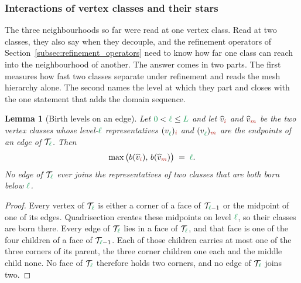 \documentclass[a4paper, 12pt]{article}
\newcommand{\green}{\color{ForestGreen}}
\newcommand{\brickred}{\color{BrickRed}}
\newcommand{\T}{\mathcal{T}}
\newcommand{\vertex}[2]{\freeQ{v}{}{#1}{#2}}
\newcommand{\vertexClass}[1]{\widehat{v}_{#1}}
\newcommand{\coarseIdxone}{{\brickred i}}
\newcommand{\coarseIdxtwo}{{\brickred m}}
\renewcommand{\l}{{\green\ell}}
\renewcommand{\L}{{\green L}}
\newcommand{\lzero}{{\green 0}}
\newcommand{\freeQ}[4]{ ( {#1}^{#2}_{#3} )_{#4}}
\newtheorem{lemma}[theorem]{Lemma}
\theoremstyle{definition}
\theoremstyle{plain}
\numberwithin{equation}{section}
\newcommand{\birthLevel}{b}
\begin{document}
\subsubsection{Interactions of vertex classes and their stars}
\label{subsubsec:two_classes}

The three neighbourhoods so far were read at one vertex class. Read at two classes, they also say when they decouple, and the refinement operators of Section~\ref{subsec:refinement_operators} need to know how far one class can reach into the neighbourhood of another. The answer comes in two parts. The first measures how fast two classes separate under refinement and reads the mesh hierarchy alone. The second names the level at which they part and closes with the one statement that adds the domain sequence.

\begin{lemma}[Birth levels on an edge]
    \label{lemma:edge_birth_levels}
    Let $\lzero < \l \leq \L$ and let $\vertexClass{\coarseIdxone}$ and $\vertexClass{\coarseIdxtwo}$ be the two vertex classes whose level-$\l$ representatives $\vertex{\l}{\coarseIdxone}$ and $\vertex{\l}{\coarseIdxtwo}$ are the endpoints of an edge of $\T_\l$. Then
    \begin{equation}
        \label{eq:edge_birth_levels}
        \max \big( \birthLevel(\vertexClass{\coarseIdxone}), \, \birthLevel(\vertexClass{\coarseIdxtwo}) \big) \; = \; \l .
    \end{equation}
    No edge of $\T_\l$ ever joins the representatives of two classes that are both born below $\l$.
\end{lemma}
\begin{proof}
    Every vertex of $\T_\l$ is either a corner of a face of $\T_{\l-1}$ or the midpoint of one of its edges. Quadrisection creates these midpoints on level $\l$, so their classes are born there. Every edge of $\T_\l$ lies in a face of $\T_\l$, and that face is one of the four children of a face of $\T_{\l-1}$. Each of those children carries at most one of the three corners of its parent, the three corner children one each and the middle child none. No face of $\T_\l$ therefore holds two corners, and no edge of $\T_\l$ joins two.
\end{proof}
\end{document}
